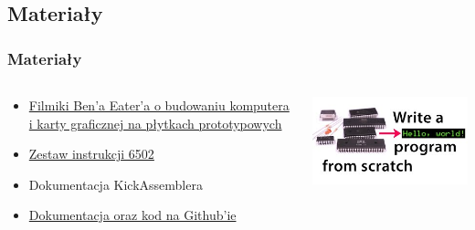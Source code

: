 \documentclass[aspectratio=169]{beamer}
\begin{document}
\subsection{Materiały}
\begin{frame}
    \frametitle{Materiały}
    \begin{columns}
        \begin{column}{.6\textwidth}
            \begin{itemize}
                \item \href{https://eater.net/}{Filmiki Ben'a Eater'a o budowaniu komputera i karty graficznej na płytkach prototypowych}
                \item \href{https://www.masswerk.at/6502/6502_instruction_set.html}{Zestaw instrukcji 6502}
                \item Dokumentacja KickAssemblera
                \item \href{https://github.com/HakierGrzonzo/bfc64}{Dokumentacja oraz kod na Github'ie}
            \end{itemize}
        \end{column}
        \begin{column}{.4\textwidth}
            \includegraphics[scale=.5]{6502YT.jpg}
        \end{column}
    \end{columns}
\end{frame}
\end{document}
